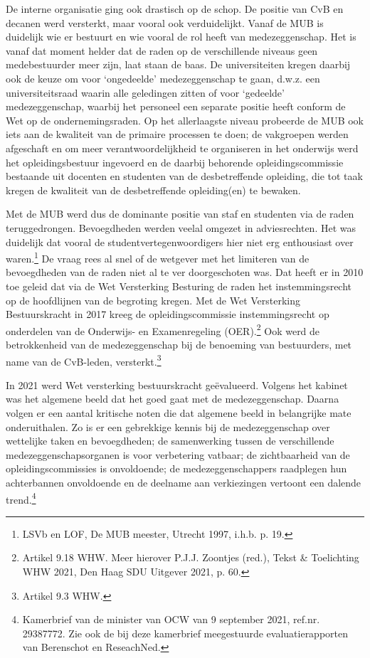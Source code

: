 \documentclass{jote-book}
\begin{document}
	De interne organisatie ging ook drastisch op de schop. De positie van CvB en decanen werd versterkt, maar vooral ook verduidelijkt. Vanaf de MUB is duidelijk wie er bestuurt en wie vooral de rol heeft van medezeggenschap. Het is vanaf dat moment helder dat de raden op de verschillende niveaus geen medebestuurder meer zijn, laat staan de baas. De universiteiten kregen daarbij ook de keuze om voor ‘ongedeelde' medezeggenschap te gaan, d.w.z. een universiteitsraad waarin alle geledingen zitten of voor ‘gedeelde' medezeggenschap, waarbij het personeel een separate positie heeft conform de Wet op de ondernemingsraden. Op het allerlaagste niveau probeerde de MUB ook iets aan de kwaliteit van de primaire processen te doen; de vakgroepen werden afgeschaft en om meer verantwoordelijkheid te organiseren in het onderwijs werd het opleidingsbestuur ingevoerd en de daarbij behorende opleidingscommissie bestaande uit docenten en studenten van de desbetreffende opleiding, die tot taak kregen de kwaliteit van de desbetreffende opleiding(en) te bewaken.



	Met de MUB werd dus de dominante positie van staf en studenten via de raden teruggedrongen. Bevoegdheden werden veelal omgezet in adviesrechten. Het was duidelijk dat vooral de studentvertegenwoordigers hier niet erg enthousiast over waren.\footnote{LSVb en LOF, De MUB meester, Utrecht 1997, i.h.b. p. 19.} De vraag rees al snel of de wetgever met het limiteren van de bevoegdheden van de raden niet al te ver doorgeschoten was. Dat heeft er in 2010 toe geleid dat via de Wet Versterking Besturing de raden het instemmingsrecht op de hoofdlijnen van de begroting kregen. Met de Wet Versterking Bestuurskracht in 2017 kreeg de opleidingscommissie instemmingsrecht op onderdelen van de Onderwijs- en Examenregeling (OER).\footnote{Artikel 9.18 WHW. Meer hierover P.J.J. Zoontjes (red.), Tekst \& Toelichting WHW 2021, Den Haag SDU Uitgever 2021, p. 60.} Ook werd de betrokkenheid van de medezeggenschap bij de benoeming van bestuurders, met name van de CvB-leden, versterkt.\footnote{Artikel 9.3 WHW.}



	In 2021 werd Wet versterking bestuurskracht geëvalueerd. Volgens het kabinet was het algemene beeld dat het goed gaat met de medezeggenschap. Daarna volgen er een aantal kritische noten die dat algemene beeld in belangrijke mate onderuithalen. Zo is er een gebrekkige kennis bij de medezeggenschap over wettelijke taken en bevoegdheden; de samenwerking tussen de verschillende medezeggenschapsorganen is voor verbetering vatbaar; de zichtbaarheid van de opleidingscommissies is onvoldoende; de medezeggenschappers raadplegen hun achterbannen onvoldoende en de deelname aan verkiezingen vertoont een dalende trend.\footnote{Kamerbrief van de minister van OCW van 9 september 2021, ref.nr. 29387772. Zie ook de bij deze kamerbrief meegestuurde evaluatierapporten van Berenschot en ReseachNed.}
\end{document}
